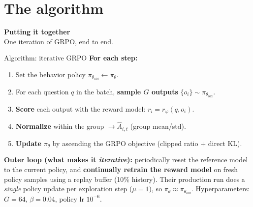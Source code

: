 \documentclass[aspectratio=169]{beamer}
\begin{document}
\section{The algorithm}

\begin{frame}[plain]
  \vfill
  \begin{center}
    {\color{popblue}\Large\bfseries Putting it together}\\[4pt]
    \small One iteration of GRPO, end to end.
  \end{center}
  \vfill
\end{frame}

\begin{frame}{Algorithm: iterative GRPO}
  \textbf{For each step:}
  \begin{enumerate}\small
    \item Set the behavior policy $\pi_{\theta_{\text{old}}}\leftarrow\pi_\theta$.
    \item For each question $q$ in the batch, \textbf{sample $G$ outputs}
      $\{o_i\}\sim\pi_{\theta_{\text{old}}}$.
    \item \textbf{Score} each output with the reward model: $r_i=r_\varphi(q,o_i)$.
    \item \textbf{Normalize} within the group $\rightarrow \hat A_{i,t}$
      (group mean/std).
    \item \textbf{Update} $\pi_\theta$ by ascending the GRPO objective (clipped ratio $+$
      direct KL).
  \end{enumerate}
  \vskip 4pt
  \textbf{Outer loop (what makes it \emph{iterative}):} periodically reset the reference
  model to the current policy, and \textbf{continually retrain the reward model} on fresh
  policy samples using a replay buffer (10\% history).
  \vskip 2pt
  \footnotesize Their production run does a \emph{single} policy update per exploration
  step ($\mu=1$), so $\pi_\theta \approx \pi_{\theta_{\text{old}}}$. Hyperparameters:
  $G=64$, $\beta=0.04$, policy lr $10^{-6}$.
\end{frame}
\end{document}
